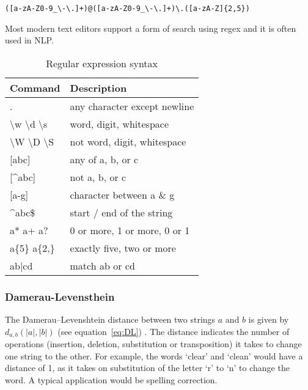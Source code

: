 \begin{verbatim}
([a-zA-Z0-9_\-\.]+)@([a-zA-Z0-9_\-\.]+)\.([a-zA-Z]{2,5})
\end{verbatim}

Most modern text editors support a form of search using regex and it is often used in \ac{NLP}.

\begin{table}[!htbp]
\centering
\caption[Regular expression syntax]{Regular expression syntax}
\label{tab:regex}
\begin{tabu}{ll}
\toprule
\textbf{Command}           & \textbf{Description}         \\ 
\midrule
.                          & any character except newline \\
\textbackslash w \textbackslash d \textbackslash s & word, digit, whitespace      \\
\textbackslash W \textbackslash D \textbackslash S & not word, digit, whitespace  \\
{[}abc{]}                  & any of a, b, or c            \\
{[}\textasciicircum abc{]} & not a, b, or c               \\
{[}a-g{]}                  & character between a \& g     \\
\textasciicircum abc\$     & start / end of the string    \\
a* a+ a?                   & 0 or more, 1 or more, 0 or 1 \\
a\{5\} a\{2,\}             & exactly five, two or more    \\
ab|cd                      & match ab or cd               \\ 
\bottomrule
\end{tabu}
\end{table}


\subsubsection{Damerau-Levensthein}

The Damerau–Levenshtein distance\marginpar{$\bm{\Sigma}$~\ref{eq:DL}} between two strings $a$ and $b$ is given by $d_{a,b}(|a|,|b|)$ (see equation~\ref{eq:DL}) \autocite{WikipediaA, Damerau1964, Levenshtein1966}. The distance indicates the number of operations (insertion, deletion, substitution or transposition) it takes to change one string to the other. For example, the words `clear' and `clean' would have a distance of 1, as it takes on substitution of the letter `r' to `n' to change the word. A typical application would be spelling correction. 

